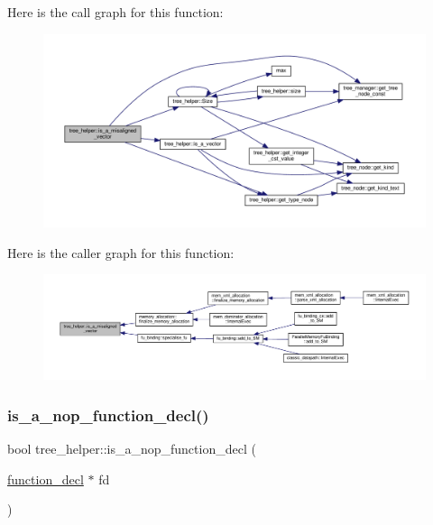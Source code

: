 Here is the call graph for this function\+:
\nopagebreak
\begin{figure}[H]
\begin{center}
\leavevmode
\includegraphics[width=350pt]{d7/d99/classtree__helper_aa81c329e263e98a34db9f443eeac94ca_cgraph}
\end{center}
\end{figure}
Here is the caller graph for this function\+:
\nopagebreak
\begin{figure}[H]
\begin{center}
\leavevmode
\includegraphics[width=350pt]{d7/d99/classtree__helper_aa81c329e263e98a34db9f443eeac94ca_icgraph}
\end{center}
\end{figure}
\mbox{\label{classtree__helper_abfafd9aff94ad9bc9d4cd8aee81e044e}} 
\subsubsection{\texorpdfstring{is\+\_\+a\+\_\+nop\+\_\+function\+\_\+decl()}{is\_a\_nop\_function\_decl()}}
{\footnotesize\ttfamily bool tree\+\_\+helper\+::is\+\_\+a\+\_\+nop\+\_\+function\+\_\+decl (\begin{DoxyParamCaption}\item[{\hyperlink{structfunction__decl}{function\+\_\+decl} $\ast$}]{fd }\end{DoxyParamCaption})\hspace{0.3cm}{\ttfamily [static]}}



